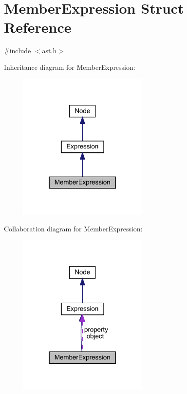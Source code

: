\hypertarget{struct_member_expression}{}\section{Member\+Expression Struct Reference}
\label{struct_member_expression}


{\ttfamily \#include $<$ast.\+h$>$}



Inheritance diagram for Member\+Expression\+:\nopagebreak
\begin{figure}[H]
\begin{center}
\leavevmode
\includegraphics[width=182pt]{struct_member_expression__inherit__graph}
\end{center}
\end{figure}


Collaboration diagram for Member\+Expression\+:\nopagebreak
\begin{figure}[H]
\begin{center}
\leavevmode
\includegraphics[width=182pt]{struct_member_expression__coll__graph}
\end{center}
\end{figure}
